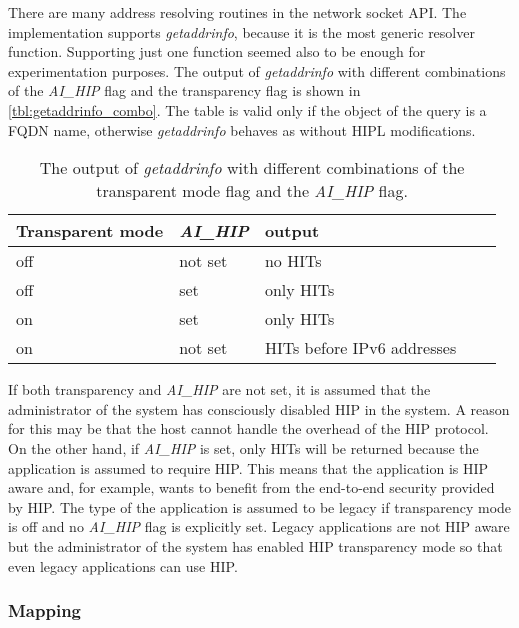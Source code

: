 There are many address resolving routines in the network socket
API. The implementation supports \textit{getaddrinfo}, because it is
the most generic resolver function. Supporting just one function
seemed also to be enough for experimentation purposes. The output of
\textit{getaddrinfo} with different combinations of the
\textit{AI\_HIP} flag and the transparency flag is shown in
\autoref{tbl:getaddrinfo_combo}. The table is valid only if the object
of the query is a FQDN name, otherwise \textit{getaddrinfo} behaves as
without HIPL modifications.

\begin{table}[htb]
\centering
\begin{tabular}{|l|l|l|l|l|} \hline
Transparent mode & \textit{AI\_HIP}  & output                   \\\hline
off        & not set        & no HITs                    \\
off        & set            & only HITs                  \\
on         & set            & only HITs                  \\
on         & not set        & HITs before IPv6 addresses \\
\hline
\end{tabular}
\caption{The output of \textit{getaddrinfo} with different combinations of
the transparent mode flag and the \textit{AI\_HIP} flag. }
\label{tbl:getaddrinfo_combo}
\end{table}

If both transparency and \textit{AI\_HIP} are not set, it is assumed
that the administrator of the system has consciously disabled HIP in
the system. A reason for this may be that the host cannot handle the
overhead of the HIP protocol. On the other hand, if \textit{AI\_HIP}
is set, only HITs will be returned because the application is assumed
to require HIP. This means that the application is HIP aware and, for
example, wants to benefit from the end-to-end security provided by
HIP. The type of the application is assumed to be legacy if
transparency mode is off and no \textit{AI\_HIP} flag is explicitly
set. Legacy applications are not HIP aware but the administrator of
the system has enabled HIP transparency mode so that even legacy
applications can use HIP.

\subsubsection{Mapping}
\label{sec:mapping_architecture}


